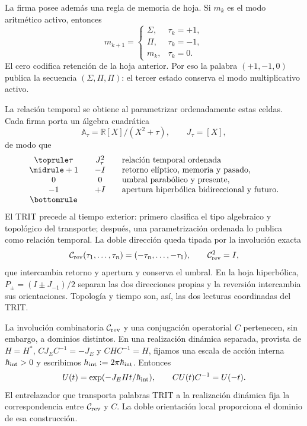 La firma posee además una regla de memoria de hoja. Si \(m_k\) es el modo
aritmético activo, entonces
\begin{equation}
m_{k+1}=
\begin{cases}
\Sigma,&\tau_k=+1,\\
\Pi,&\tau_k=-1,\\
m_k,&\tau_k=0.
\end{cases}
\label{p12-83-c3-s1:eq:trit-zero-memory}
\end{equation}
El cero codifica retención de la hoja anterior. Por eso la palabra
\((+1,-1,0)\) publica la secuencia \((\Sigma,\Pi,\Pi)\): el tercer estado
conserva el modo multiplicativo activo.

La relación temporal se obtiene al parametrizar ordenadamente estas celdas.
Cada firma porta un álgebra cuadrática
\begin{equation}
\mathbb A_\tau=\mathbb R[X]/(X^2+\tau),
\qquad J_\tau=[X],
\label{p12-83-c3-s1:eq:trit-quadratic-algebra-local}
\end{equation}
de modo que
\[
\begin{array}{c@{\qquad}c@{\qquad}l}
\toprule
\tau & J_\tau^2 & \text{relación temporal ordenada}\\
\midrule
+1 & -I & \text{retorno elíptico, memoria y pasado},\\
0  & 0  & \text{umbral parabólico y presente},\\
-1 & +I & \text{apertura hiperbólica bidireccional y futuro}.\\
\bottomrule
\end{array}
\]
El TRIT precede al tiempo exterior: primero clasifica el tipo algebraico y
topológico del transporte; después, una parametrización ordenada lo publica
como relación temporal. La doble dirección queda tipada por la involución
exacta
\begin{equation}
\mathcal C_{\rm rev}(\tau_1,\ldots,\tau_n)
=(-\tau_n,\ldots,-\tau_1),
\qquad \mathcal C_{\rm rev}^2=I,
\label{p12-83-c3-s1:eq:trit-time-reversal}
\end{equation}
que intercambia retorno y apertura y conserva el umbral. En la hoja
hiperbólica, \(P_\pm=(I\pm J_{-1})/2\) separan las dos direcciones propias y
la reversión intercambia sus orientaciones. Topología y tiempo son, así, las
dos lecturas coordinadas del TRIT.

La involución combinatoria \(\mathcal C_{\rm rev}\) y una conjugación
operatorial \(C\) pertenecen, sin embargo, a dominios distintos. En una
realización dinámica separada, provista de \(H=H^*\),
\(CJ_EC^{-1}=-J_E\) y \(CHC^{-1}=H\), fijamos una escala de acción interna
\(\hbar_{\rm int}>0\) y escribimos
\(h_{\rm int}:=2\pi\hbar_{\rm int}\). Entonces
\begin{equation}
U(t)=\exp(-J_EHt/\hbar_{\rm int}),
\qquad CU(t)C^{-1}=U(-t).
\label{p12-83-c3-s1:eq:trit-bidirectional-propagator}
\end{equation}
El entrelazador que transporta palabras TRIT a la realización dinámica fija
la correspondencia entre \(\mathcal C_{\rm rev}\) y \(C\). La doble
orientación local proporciona el dominio de esa construcción.

